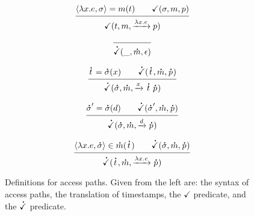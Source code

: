 \documentclass[acmsmall,screen,review]{acmart}\settopmatter{printfolios=true,printccs=false,printacmref=false}
\theoremstyle{acmdefinition}
\newcommand*{\A}[1]{\overset{\,_{\mbox{\Large .}}}{#1}}
\newcommand*{\modid}{d}
\newcommand*{\ctx}{\sigma}
\newcommand*{\mem}{m}
\newcommand*{\valid}{\checkmark}
\begin{document}
\begin{figure}[t!]
\begin{minipage}{0.3\linewidth}
    \[
      \begin{prooftree}
        \hypo{\langle\lambda x.e,{\ctx}\rangle=\mem(t)\qquad\valid(\ctx,\mem,p)}
        \infer1{\valid(t,\mem,\xrightarrow{\lambda x.e}p)}
      \end{prooftree}
    \]
  \end{minipage}
  \begin{minipage}{0.3\linewidth}
    \footnotesize
    \[
      \begin{prooftree}
        \infer0{\A\valid(\_,\A\mem,\epsilon)}
      \end{prooftree}
    \]

    \[
      \begin{prooftree}
        \hypo{\A{t}=\A\ctx(x)\qquad\A\valid(\A{t},\A\mem,\A{p})}
        \infer1{\A\valid(\A\ctx,\A\mem,\xrightarrow{x}\A{t}\:\A{p})}
      \end{prooftree}
    \]

    \[
      \begin{prooftree}
        \hypo{\A\ctx'=\A\ctx(\modid)\qquad\A\valid(\A\ctx',\A\mem,\A{p})}
        \infer1{\A\valid(\A\ctx,\A\mem,\xrightarrow{\modid}\A{p})}
      \end{prooftree}
    \]

    \[
      \begin{prooftree}
        \hypo{\langle\lambda x.e,{\A\ctx}\rangle\in\A\mem(\A{t})\qquad\A\valid(\A\ctx,\A\mem,\A{p})}
        \infer1{\A\valid(\A{t},\A\mem,\xrightarrow{\lambda x.e}\A{p})}
      \end{prooftree}
    \]
  \end{minipage}
  \caption{Definitions for access paths. Given from the left are: the syntax of access paths, the translation of timestamps, the $\valid$ predicate, and the $\A\valid$ predicate.}
  \label{fig:valid}
\end{figure}
\end{document}
